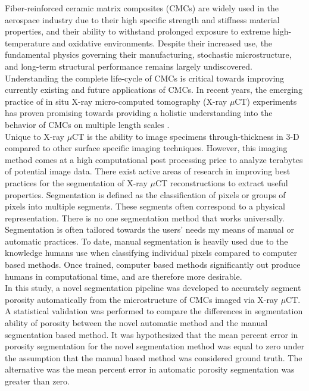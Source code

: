 \documentclass[12pt]{article}
\begin{document}
Fiber-reinforced ceramic matrix composites (CMCs) are widely used in the aerospace industry due to their high specific strength and stiffness material properties, and their ability to withstand prolonged exposure to extreme high-temperature and oxidative environments. Despite their increased use, the fundamental physics governing their manufacturing, stochastic microstructure, and long-term structural performance remains largely undiscovered. Understanding the complete life-cycle of CMCs is critical towards improving currently existing and future applications of CMCs. In recent years, the emerging practice of in situ X-ray micro-computed tomography (X-ray $\mu$CT) experiments has proven promising towards providing a holistic understanding into the behavior of CMCs on multiple length scales \cite{Larson,Bale,Bale2,Cox,Haboub,Marshall}.\\
Unique to X-ray $\mu$CT is the ability to image specimens through-thickness in 3-D compared to other surface specific imaging techniques. However, this imaging method comes at a high computational post processing price to analyze terabytes of potential image data. There exist active areas of research in improving best practices for the segmentation of X-ray $\mu$CT reconstructions to extract useful properties. Segmentation is defined as the classification of pixels or groups of pixels into multiple segments. These segments often correspond to a physical representation. There is no one segmentation method that works universally. Segmentation is often tailored towards the users’ needs my means of manual or automatic practices. To date, manual segmentation is heavily used due to the knowledge humans use when classifying individual pixels compared to computer based methods. Once trained, computer based methods significantly out produce humans in computational time, and are therefore more desirable.\\
In this study, a novel segmentation pipeline was developed to accurately segment porosity automatically from the microstructure of CMCs imaged via X-ray $\mu$CT. A statistical validation was performed to compare the differences in segmentation ability of porosity between the novel automatic method and the manual segmentation based method. It was hypothesized that the mean percent error in porosity segmentation for the novel segmentation method was equal to zero under the assumption that the manual based method was considered ground truth. The alternative was the mean percent error in automatic porosity segmentation was greater than zero.
\end{document}
